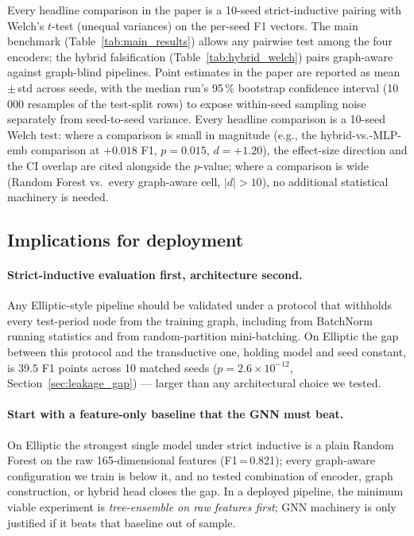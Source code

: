Every headline comparison in the paper is a 10-seed strict-inductive
pairing with Welch's $t$-test (unequal variances) on the per-seed F1
vectors.  The main benchmark (Table~\ref{tab:main_results}) allows
any pairwise test among the four encoders; the hybrid falsification
(Table~\ref{tab:hybrid_welch}) pairs graph-aware against graph-blind
pipelines.  Point estimates in the paper are reported as
mean\,$\pm$\,std across seeds, with the median run's 95\,\% bootstrap
confidence interval (10\,000 resamples of the test-split rows) to
expose within-seed sampling noise separately from seed-to-seed
variance.  Every headline comparison is a 10-seed Welch test:
where a comparison is small in magnitude (e.g., the
hybrid-vs.-MLP-emb comparison at $+0.018$ F1, $p = 0.015$,
$d = +1.20$), the effect-size direction and the CI overlap are
cited alongside the $p$-value; where a comparison is wide (Random
Forest vs.\ every graph-aware cell, $|d| > 10$), no additional
statistical machinery is needed.

\subsection{Implications for deployment}

\paragraph{Strict-inductive evaluation first, architecture second.}
Any Elliptic-style pipeline should be validated under a protocol that
withholds every test-period node from the training graph, including
from BatchNorm running statistics and from random-partition
mini-batching.  On Elliptic the gap between this protocol and the
transductive one, holding model and seed constant, is $39.5$ F1
points across 10 matched seeds ($p = 2.6 \times 10^{-12}$,
Section~\ref{sec:leakage_gap}) --- larger than any architectural
choice we tested.

\paragraph{Start with a feature-only baseline that the GNN must beat.}
On Elliptic the strongest single model under strict inductive is a
plain Random Forest on the raw 165-dimensional features
(F1\,=\,0.821); every graph-aware configuration we train is below it,
and no tested combination of encoder, graph construction, or hybrid
head closes the gap.  In a deployed pipeline, the minimum viable
experiment is \emph{tree-ensemble on raw features first}; GNN
machinery is only justified if it beats that baseline out of sample.

